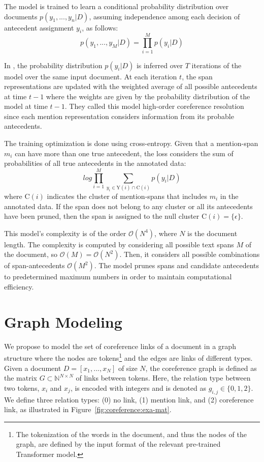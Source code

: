 \documentclass[11pt]{article}
\begin{document}
The model is trained to learn a conditional probability distribution over documents $p(y_1, ...,y_n|D)$, assuming independence among each decision of antecedent assignment $y_i$, as follows:
\begin{equation}
	p(y_1, ...,y_M|D) = \prod_{i=1}^M p(y_i|D)
\end{equation}

In \cite{lee-etal-2018-higher}, the probability distribution $p(y_i|D)$ is inferred over $T$ iterations of the model over the same input document. At each iteration $t$, the span representations are updated with the weighted average of all possible antecedents at time $t-1$ where the weights are given by the probability distribution of the model at time $t-1$.  
They called this model high-order coreference resolution since each mention representation considers information from its probable antecedents.  

The training optimization is done using cross-entropy. Given that a mention-span $m_i$ can have more than one true antecedent, the loss considers the sum of probabilities of all true antecedents in the annotated data: 
\begin{equation}\label{eq:coreference:log}
log \prod_{i=1}^M \sum_{y_i \in \mathrm{Y}(i) \cap \mathrm{C}(i)} p(y_i|D)
\end{equation}
where $\mathrm{C}(i)$ indicates the cluster of mention-spans that includes $m_i$ in the annotated data. If the span does not belong to any cluster or all its antecedents have been pruned, then the span is assigned to the null cluster $\mathrm{C}(i)=\{\epsilon\}$. 

This model's complexity is of the order $\mathcal{O}(N^4)$, where $N$ is the document length. The complexity is computed by considering all possible text spans $M$ of the document, so $\mathcal{O}(M) = \mathcal{O}(N^2)$. Then, it considers all possible combinations of span-antecedents $\mathcal{O}(M^2)$. The model prunes spans and candidate antecedents to predetermined maximum numbers in order to maintain computational efficiency.




\section{Graph Modeling} 
\label{sec:coreference:graph}

We propose to model the set of coreference links of a document in a graph structure where the nodes are tokens\footnote{The tokenization of the words in the document, and thus the nodes of the graph, are defined by the input format of the relevant pre-trained Transformer model.} and the edges are links of different types.  Given a document $D=[x_1,...,x_N]$ of size $N$, the coreference graph is defined as the matrix $G \subset \mathbb{N}^{N \times N}$ of links between tokens. Here, the relation type between two tokens, $x_i$ and $x_j$, is encoded with integers and is denoted as $g_{i,j} \in \{0,1,2\}$. We define three relation types: (0) no link, (1) mention link, and (2) coreference link,
as illustrated in Figure~\ref{fig:coreference:exa-mat}. 
\end{document}
